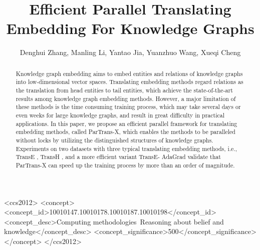 \documentclass[sigconf]{acmart}
\begin{document}
\title{Efficient Parallel Translating Embedding For Knowledge Graphs }



\author{Denghui Zhang, Manling Li, Yantao Jia, Yuanzhuo Wang, Xueqi Cheng}









\renewcommand{\shortauthors}{D. Zhang et al.}


\begin{abstract}
Knowledge graph embedding aims to embed entities and relations of knowledge graphs into low-dimensional vector spaces. 
Translating embedding methods regard relations as the translation from head entities to tail entities, which achieve the state-of-the-art results among knowledge graph embedding methods. However, a major limitation of these methods is the time consuming training process,  which may take several days or even weeks for large knowledge graphs, and result in great difficulty in practical applications. 
In this paper, we propose an efficient parallel framework for translating embedding methods, called ParTrans-X, which enables the methods to be paralleled without locks by utilizing the distinguished structures of knowledge graphs. Experiments on two datasets with three typical translating embedding methods, i.e., TransE \cite{bordes2013translating}, TransH \cite{Wang2014Knowledge}, and a more efficient variant TransE- AdaGrad \cite{Lin2015Learning} validate that ParTrans-X can speed up the training process by more than an order of magnitude.
\end{abstract}

\begin{CCSXML}
<ccs2012>
<concept>
<concept_id>10010147.10010178.10010187.10010198</concept_id>
<concept_desc>Computing methodologies~Reasoning about belief and knowledge</concept_desc>
<concept_significance>500</concept_significance>
</concept>
</ccs2012>
\end{CCSXML}
\end{document}
